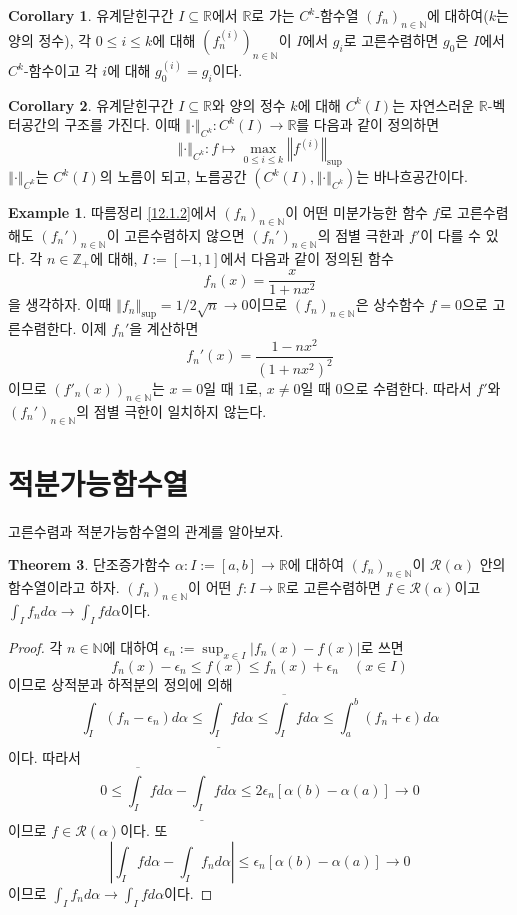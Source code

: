 \documentclass[11pt]{book}
\numberwithin{equation}{chapter}
\def\NN{\mathbb{N}}
\def\ZZ{\mathbb{Z}}
\def\RR{\mathbb{R}}
\def\eps{\epsilon}
\def\calR{\mathcal{R}}
\newcommand{\abs}[1]{\left\vert#1\right\vert}
\newcommand{\norm}[1]{\left\Vert#1\right\Vert}
\newcommand{\lowint}[2]{\underline{\int_{#1}^{#2}}}
\newcommand{\upint}[2]{\overline{\int_{#1}^{#2}}}
\theoremstyle{definition}
\newtheorem{thm}{Theorem}[section]
\newtheorem{cor}[thm]{Corollary}
\newtheorem*{ex}{Example}
\begin{document}
\begin{cor}
    유계닫힌구간 \(I \subseteq \RR\)에서 \(\RR\)로 가는 \(C^k\)-함수열 \((f_n)_{n \in \NN}\)에 대하여(\(k\)는 양의 정수), 각 \(0 \le i \le k\)에 대해 \((f_n^{(i)})_{n \in \NN}\)이 \(I\)에서 \(g_i\)로 고른수렴하면 \(g_0\)은 \(I\)에서 \(C^k\)-함수이고 각 \(i\)에 대해 \(g_0^{(i)} = g_i\)이다.
\end{cor}

\begin{cor}
    유계닫힌구간 \(I \subseteq \RR\)와 양의 정수 \(k\)에 대해 \(C^k(I)\)는 자연스러운 \(\RR\)-벡터공간의 구조를 가진다. 이때 \(\norm{\cdot}_{C^k} : C^k(I) \to \RR \)를 다음과 같이 정의하면
    \[
    \norm{\cdot}_{C^k} : f \mapsto \max_{0 \le i \le k} \norm{f^{(i)}}_{\sup}    
    \] 
    \(\norm{\cdot}_{C^k}\)는 \(C^k(I)\)의 노름이 되고, 노름공간 \((C^k(I), \norm{\cdot}_{C^k})\)는 바나흐공간이다.
\end{cor}

\begin{ex}
    따름정리 \ref{12.1.2}에서 \((f_n)_{n \in \NN}\)이 어떤 미분가능한 함수 \(f\)로 고른수렴해도 \((f_n')_{n \in \NN}\)이 고른수렴하지 않으면 \((f_n')_{n \in \NN}\)의 점별 극한과 \(f'\)이 다를 수 있다. 각 \(n \in \ZZ_+\)에 대해, \(I := [-1, 1]\)에서 다음과 같이 정의된 함수
    \[
    f_n(x) = \frac{x}{1+nx^2}    
    \]
    을 생각하자. 이때 \(\norm{f_n}_{\sup} = 1/2\sqrt{n} \to 0\)이므로 \((f_n)_{n \in \NN}\)은 상수함수 \(f = 0\)으로 고른수렴한다. 이제 \(f_n'\)을 계산하면
    \[
    f_n'(x) = \frac{1-nx^2}{(1+nx^2)^2}    
    \]
    이므로 \((f'_n(x))_{n \in \NN}\)는 \(x = 0\)일 때 1로, \(x \ne 0\)일 때 0으로 수렴한다. 따라서 \(f'\)와 \((f_n')_{n \in \NN}\)의 점별 극한이 일치하지 않는다.
\end{ex}

\section{적분가능함수열} \label{sec12.2}

고른수렴과 적분가능함수열의 관계를 알아보자.

\begin{thm}
    단조증가함수 \(\alpha : I := [a, b] \to \RR\)에 대하여 \((f_n)_{n \in \NN}\)이 \(\calR(\alpha)\) 안의 함수열이라고 하자. \((f_n)_{n \in \NN}\)이 어떤 \(f : I \to \RR\)로 고른수렴하면 \(f \in \calR(\alpha)\)이고 \(\int_I f_n d \alpha \to \int_I f d \alpha\)이다.
\end{thm}
\begin{proof}
    각 \(n \in \NN\)에 대하여 \(\eps_n := \sup_{x \in I} \abs{f_n(x) - f(x)}\)로 쓰면
    \[
    f_n (x) - \eps_n \le f(x) \le f_n(x) + \eps_n \quad (x \in I)    
    \]
    이므로 상적분과 하적분의 정의에 의해
    \[
    \int_I (f_n - \eps_n) d\alpha \le \lowint{I}{} f d\alpha \le \upint{I}{} f d\alpha \le \int_a^b (f_n + \eps) d\alpha    
    \]
    이다. 따라서
    \[
    0 \le \upint{I}{} f d\alpha - \lowint{I}{} f d\alpha  \le 2\eps_n [\alpha(b) - \alpha(a)] \to 0
    \]
    이므로 \(f \in \calR(\alpha)\)이다. 또
    \[
    \abs{\int_I f d\alpha - \int_I f_n d\alpha} \le \eps_n[\alpha(b) - \alpha(a)] \to 0    
    \]
    이므로 \(\int_I f_n d \alpha \to \int_I f d \alpha\)이다.
\end{proof}
\end{document}
